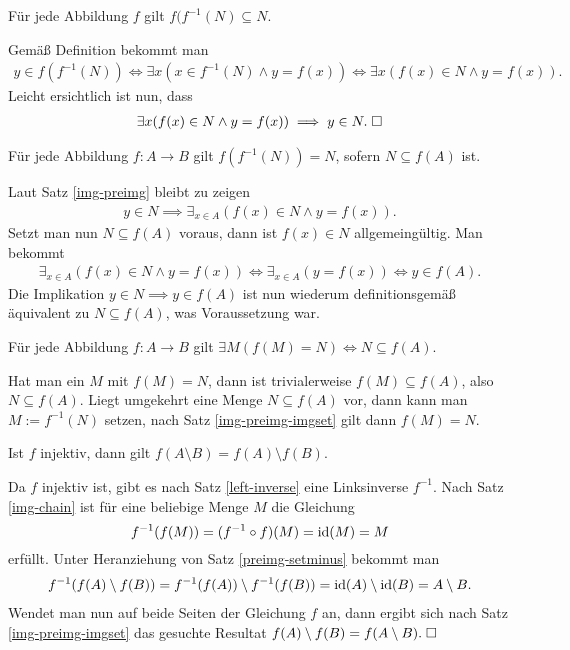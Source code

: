 \begin{Satz}\label{img-preimg}
Für jede Abbildung $f$ gilt $f(f^{-1}(N)\subseteq N$.
\end{Satz}
\begin{Beweis}
Gemäß Definition bekommt man
\begin{gather*}
y\in f(f^{-1}(N))
\iff \exists x(x\in f^{-1}(N)\land y=f(x))
\iff\exists x(f(x)\in N\land y=f(x)).
\end{gather*}
Leicht ersichtlich ist nun, dass
\begin{gather*}
\exists x(f(x)\in N\land y=f(x)) \implies y\in N.\;\square
\end{gather*}
\end{Beweis}

\begin{Satz}\label{img-preimg-imgset}
Für jede Abbildung $f\colon A\to B$ gilt $f(f^{-1}(N))=N$,
sofern $N\subseteq f(A)$ ist.
\end{Satz}
\begin{Beweis}
Laut Satz \ref{img-preimg} bleibt zu zeigen
\begin{gather*}
y\in N\implies\exists_{x\in A}(f(x)\in N\land y=f(x)).
\end{gather*}
Setzt man nun $N\subseteq f(A)$ voraus, dann ist $f(x)\in N$
allgemeingültig. Man bekommt
\begin{gather*}
\exists_{x\in A}(f(x)\in N\land y=f(x))
\iff \exists_{x\in A}(y=f(x))\iff y\in f(A).
\end{gather*}
Die Implikation $y\in N\implies y\in f(A)$ ist nun
wiederum definitionsgemäß äquivalent zu $N\subseteq f(A)$,
was Voraussetzung war.\;\qedsymbol
\end{Beweis}

\begin{Satz}
Für jede Abbildung $f\colon A\to B$ gilt
$\exists M(f(M)=N)\iff N\subseteq f(A)$.
\end{Satz}
\begin{Beweis}
Hat man ein $M$ mit $f(M)=N$, dann ist trivialerweise
$f(M)\subseteq f(A)$, also $N\subseteq f(A)$. Liegt umgekehrt
eine Menge $N\subseteq f(A)$ vor, dann kann man $M:=f^{-1}(N)$
setzen, nach Satz \ref{img-preimg-imgset} gilt dann $f(M)=N$.\;\qedsymbol
\end{Beweis}

\begin{Satz}\label{inj-img-setminus}
Ist $f$ injektiv, dann gilt $f(A\setminus B)=f(A)\setminus f(B)$.
\end{Satz}
\begin{Beweis}
Da $f$ injektiv ist, gibt es nach Satz \ref{left-inverse} eine
Linksinverse $f^{-1}$. Nach Satz \ref{img-chain} ist für eine
beliebige Menge $M$ die Gleichung
\[f^{-1}(f(M)) = (f^{-1}\circ f)(M) = \operatorname{id}(M) = M\]
erfüllt. Unter Heranziehung von Satz \ref{preimg-setminus}
bekommt man
\begin{gather*}
f^{-1}(f(A)\setminus f(B)) = f^{-1}(f(A))\setminus f^{-1}(f(B))
= \operatorname{id}(A)\setminus\operatorname{id}(B) = A\setminus B.
\end{gather*}
Wendet man nun auf beide Seiten der Gleichung $f$ an, dann ergibt
sich nach Satz \ref{img-preimg-imgset} das gesuchte Resultat
$f(A)\setminus f(B) = f(A\setminus B).\;\square$
\end{Beweis}

